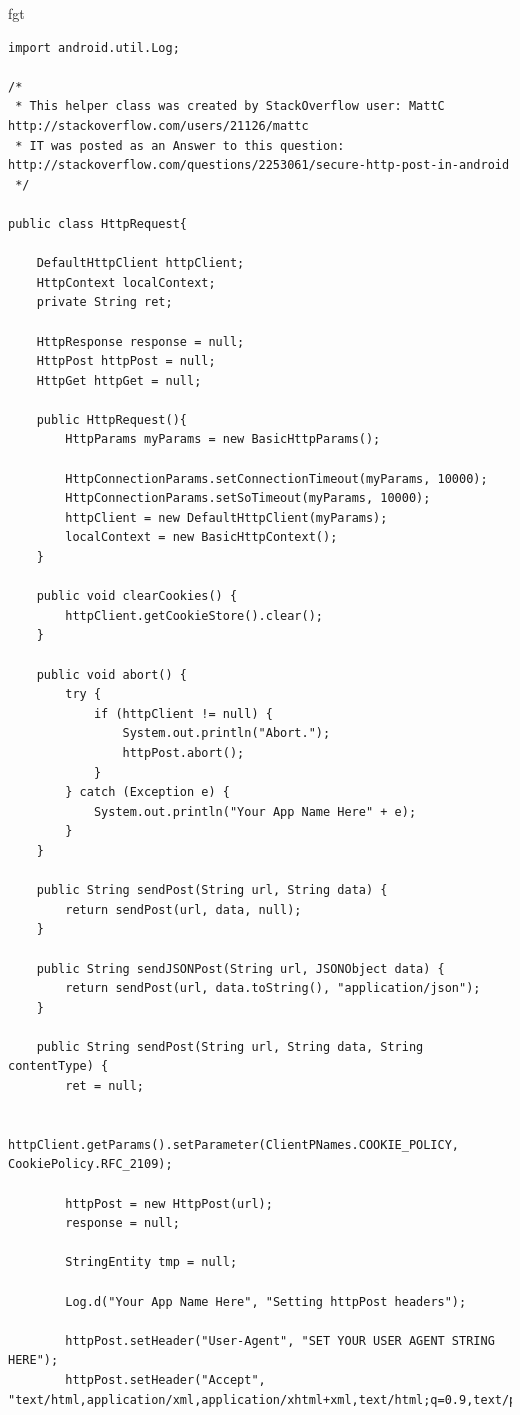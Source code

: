 fgt\documentclass[12pt, %
openright, 
oneside, %
a4paper,    %
brazil]{facom-ufu-abntex2}
\begin{document}
\begin{anexosenv}
\begin{lstlisting}
import android.util.Log;

/*
 * This helper class was created by StackOverflow user: MattC http://stackoverflow.com/users/21126/mattc
 * IT was posted as an Answer to this question: http://stackoverflow.com/questions/2253061/secure-http-post-in-android
 */

public class HttpRequest{

    DefaultHttpClient httpClient;
    HttpContext localContext;
    private String ret;

    HttpResponse response = null;
    HttpPost httpPost = null;
    HttpGet httpGet = null;

    public HttpRequest(){
        HttpParams myParams = new BasicHttpParams();

        HttpConnectionParams.setConnectionTimeout(myParams, 10000);
        HttpConnectionParams.setSoTimeout(myParams, 10000);
        httpClient = new DefaultHttpClient(myParams);       
        localContext = new BasicHttpContext();    
    }

    public void clearCookies() {
        httpClient.getCookieStore().clear();
    }

    public void abort() {
        try {
            if (httpClient != null) {
                System.out.println("Abort.");
                httpPost.abort();
            }
        } catch (Exception e) {
            System.out.println("Your App Name Here" + e);
        }
    }

    public String sendPost(String url, String data) {
        return sendPost(url, data, null);
    }

    public String sendJSONPost(String url, JSONObject data) {
        return sendPost(url, data.toString(), "application/json");
    }

    public String sendPost(String url, String data, String contentType) {
        ret = null;

        httpClient.getParams().setParameter(ClientPNames.COOKIE_POLICY, CookiePolicy.RFC_2109);

        httpPost = new HttpPost(url);
        response = null;

        StringEntity tmp = null;        

        Log.d("Your App Name Here", "Setting httpPost headers");

        httpPost.setHeader("User-Agent", "SET YOUR USER AGENT STRING HERE");
        httpPost.setHeader("Accept", "text/html,application/xml,application/xhtml+xml,text/html;q=0.9,text/plain;q=0.8,image/png,*;q=0.5");


\end{lstlisting}
\end{anexosenv}
\end{document}
